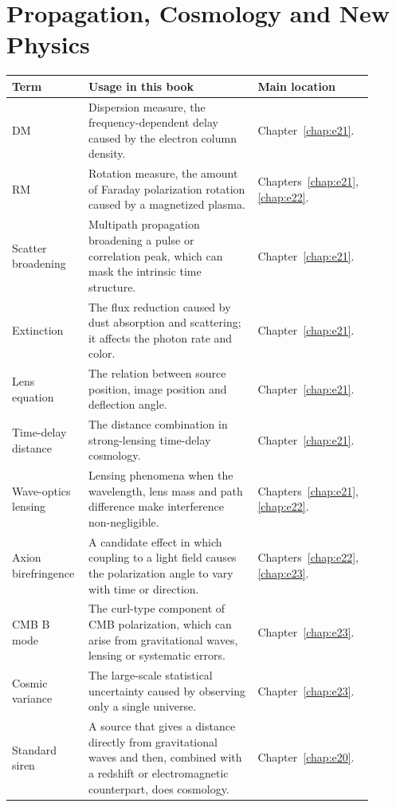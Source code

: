 \section{Propagation, Cosmology and New Physics}
\label{appsec:c-propagation}

\begin{longtable}{p{0.20\linewidth}p{0.45\linewidth}p{0.25\linewidth}}
\toprule
Term & Usage in this book & Main location \\
\midrule
DM & Dispersion measure, the frequency-dependent delay caused by the electron column density. & Chapter~\ref{chap:e21}. \\
RM & Rotation measure, the amount of Faraday polarization rotation caused by a magnetized plasma. & Chapters~\ref{chap:e21}, \ref{chap:e22}. \\
Scatter broadening & Multipath propagation broadening a pulse or correlation peak, which can mask the intrinsic time structure. & Chapter~\ref{chap:e21}. \\
Extinction & The flux reduction caused by dust absorption and scattering; it affects the photon rate and color. & Chapter~\ref{chap:e21}. \\
Lens equation & The relation between source position, image position and deflection angle. & Chapter~\ref{chap:e21}. \\
Time-delay distance & The distance combination in strong-lensing time-delay cosmology. & Chapter~\ref{chap:e21}. \\
Wave-optics lensing & Lensing phenomena when the wavelength, lens mass and path difference make interference non-negligible. & Chapters~\ref{chap:e21}, \ref{chap:e22}. \\
Axion birefringence & A candidate effect in which coupling to a light field causes the polarization angle to vary with time or direction. & Chapters~\ref{chap:e22}, \ref{chap:e23}. \\
CMB B mode & The curl-type component of CMB polarization, which can arise from gravitational waves, lensing or systematic errors. & Chapter~\ref{chap:e23}. \\
Cosmic variance & The large-scale statistical uncertainty caused by observing only a single universe. & Chapter~\ref{chap:e23}. \\
Standard siren & A source that gives a distance directly from gravitational waves and then, combined with a redshift or electromagnetic counterpart, does cosmology. & Chapter~\ref{chap:e20}. \\
\bottomrule
\end{longtable}

